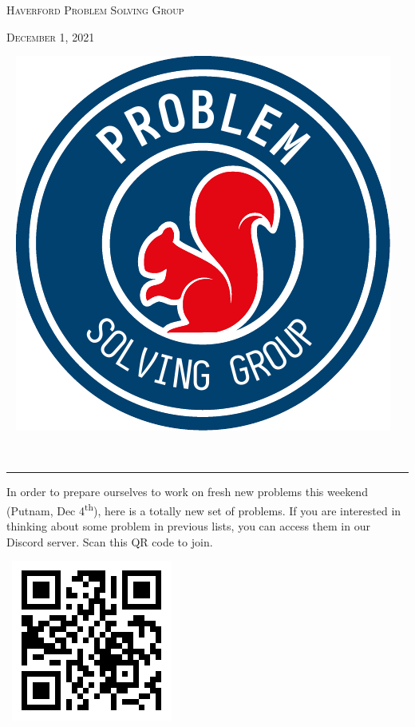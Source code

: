 \documentclass{scrartcl}
\theoremstyle{definition}
\begin{document}
\noindent\begin{minipage}{.5\textwidth}{}
	\textsc{Haverford Problem Solving Group}

	\textsc{December 1, 2021}
\end{minipage}\hfill
\begin{minipage}{.4\textwidth}{}
	\ \hfill
	\includegraphics[height = .9in]{psg_logo}
\end{minipage}\\[.5em]
\hrule

\begin{minipage}{.85\textwidth}{}
	\footnotesize
	In order to prepare ourselves to work on fresh new problems this weekend (Putnam, Dec 4\textsuperscript{th}), here is a totally new set of problems. If you are interested in thinking about some problem in previous lists, you can access them in our Discord server. Scan this QR code to join.
\end{minipage}
\begin{minipage}{.15\textwidth}{}
	\ \hfill \includegraphics[height = .8in]{qr}
\end{minipage}
\end{document}
